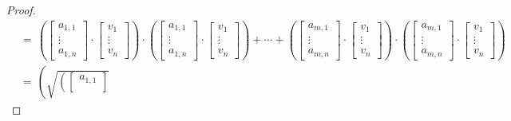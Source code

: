 \begin{proof}
\begin{align*}
        &= \hspace{2pt} \left( \begin{bmatrix}
            a_{1,1}\\
            \vdots\\
            a_{1,n}
        \end{bmatrix}
        \cdot
        \begin{bmatrix}
            v_{1}\\
            \vdots\\
            v_{n}
        \end{bmatrix} \right)
        \cdot
        \left( \begin{bmatrix}
            a_{1,1}\\
            \vdots\\
            a_{1,n}
        \end{bmatrix}
        \cdot
        \begin{bmatrix}
            v_{1}\\
            \vdots\\
            v_{n}
        \end{bmatrix} \right)
        + \cdots +
        \left( \begin{bmatrix}
            a_{m,1}\\
            \vdots\\
            a_{m,n}
        \end{bmatrix}
        \cdot
        \begin{bmatrix}
            v_{1}\\
            \vdots\\
            v_{n}
        \end{bmatrix} \right)
        \cdot
        \left( \begin{bmatrix}
            a_{m,1}\\
            \vdots\\
            a_{m,n}
        \end{bmatrix}
        \cdot
        \begin{bmatrix}
            v_{1}\\
            \vdots\\
            v_{n}
        \end{bmatrix} \right)\\[2ex]
        &= \hspace{2pt} \left(\sqrt{\left( \begin{bmatrix}
            a_{1,1}\\

\end{bmatrix}}
\end{align*}
\end{proof}
